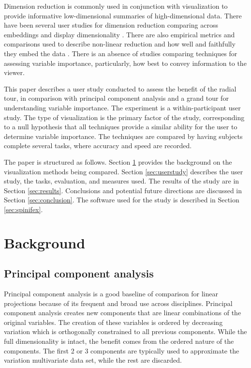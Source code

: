 \documentclass{monashthesis}
\begin{document}
Dimension reduction is commonly used in conjunction with visualization to provide informative low-dimensional summaries of high-dimensional data. There have been several user studies
for dimension reduction comparing across embeddings and display dimensionality \autocite{gracia_new_2016,wagner_filho_immersive_2018}. There are also empirical metrics and comparisons used to describe non-linear reduction and how well and faithfully they embed the data \autocite{bertini_quality_2011,liu_visualizing_2017,sedlmair_empirical_2013,van_der_maaten_visualizing_2008}. There is an absence of studies comparing techniques for assessing variable importance, particularly, how best to convey information to the viewer.

This paper describes a user study conducted to assess the benefit of the radial tour, in comparison with principal component analysis and a grand tour for understanding variable importance. The experiment is a within-participant user study. The type of visualization is the primary factor of the study, corresponding to a null hypothesis that all techniques provide a similar ability for the user to determine variable importance. The techniques are compared by having subjects complete several tasks, where accuracy and speed are recorded.

The paper is structured as follows. Section \ref{sec:background} provides the background on the visualization methods being compared. Section \ref{sec:userstudy} describes the user study, the tasks, evaluation, and measures used. The results of the study are in Section \ref{sec:results}. Conclusions and potential future directions are discussed in Section \ref{sec:conclusion}. The software used for the study is described in Section \ref{sec:spinifex}.

\hypertarget{sec:background}{%
\section{Background}\label{sec:background}}

\hypertarget{principal-component-analysis}{%
\subsection{Principal component analysis}\label{principal-component-analysis}}

Principal component analysis is a good baseline of comparison for linear projections because of its frequent and broad use across disciplines. Principal component analysis \autocite[PCA,][]{pearson_liii._1901} creates new components that are linear combinations of the original variables. The creation of these variables is ordered by decreasing variation which is orthogonally constrained to all previous components. While the full dimensionality is intact, the benefit comes from the ordered nature of the components. The first 2 or 3 components are typically used to approximate the variation multivariate data set, while the rest are discarded.
\end{document}
